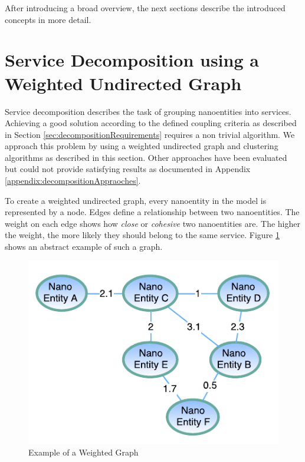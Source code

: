 \bigskip

After introducing a broad overview, the next sections describe the introduced concepts in more detail. 
 
\section{Service Decomposition using a Weighted Undirected Graph}
\label{subsec:approach1_graph}

Service decomposition describes the task of grouping nanoentities into services. Achieving a good solution according to the defined coupling criteria as described in Section \ref{sec:decompositionRequirements} requires a non trivial algorithm. We approach this problem by using a weighted undirected graph and clustering algorithms as described in this section. Other approaches have been evaluated but could not provide satisfying results as documented in Appendix \ref{appendix:decompositionAppraoches}.

\begin{minipage}[t]{0.6\textwidth}
	\setlength{\parskip}{5pt plus 0.1pt}	
	To create a weighted undirected graph, every nanoentity in the model is represented by a node. Edges define a relationship between two nanoentities. The weight on each edge shows how \textit{close} or \textit{cohesive} two nanoentities are. The higher the weight, the more likely they should belong to the same service. Figure \ref{fig:weighted_graph} shows an abstract example of such a graph.
\end{minipage}
\begin{minipage}[t]{0.4\textwidth}	
	\begin{figure}[H]
		\includegraphics[scale=0.8]{diagrams/weighted_graph.pdf}
		\caption{Example of a Weighted Graph}
		\label{fig:weighted_graph}
	\end{figure}
	
\end{minipage}

